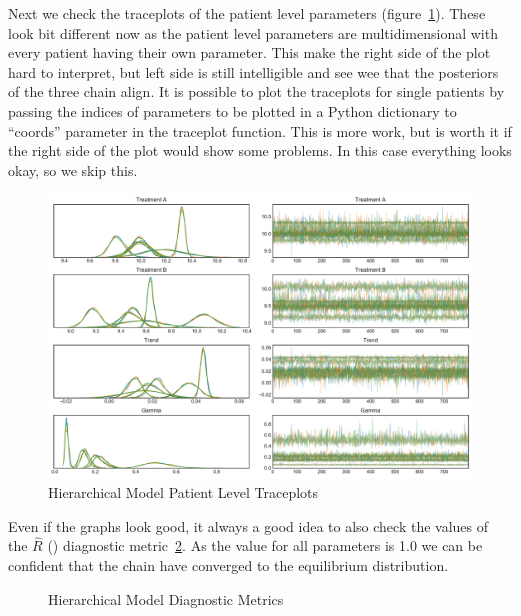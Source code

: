\documentclass[12pt,a4paper,leqno]{report}
\theoremstyle{plain}
\theoremstyle{definition}
\theoremstyle{remark}
\begin{document}
Next we check the traceplots of the patient level parameters (figure\
\ref{hierarchicalmodelpatienttraceplots}). These look bit different now as the patient
level parameters are multidimensional with every patient having their own
parameter. This make the right side of the plot hard to interpret, but left side is
still intelligible and see wee that the posteriors of the three chain align. It is
possible to plot the traceplots for single patients by passing the indices of parameters
to be plotted in a Python dictionary to ``coords'' parameter in the traceplot function.
This is more work, but is worth it if the right side of the plot would show some
problems. In this case everything looks okay, so we skip this.

\bigskip
\begin{figure}[H]
    \caption{Hierarchical Model Patient Level Traceplots}\label{hierarchicalmodelpatienttraceplots}
    \bigskip
    \includegraphics[width=\textwidth,height=\textheight,keepaspectratio]{hierarchical_model_patient_level_traceplot.pdf}
\end{figure}
\bigskip

Even if the graphs look good, it always a good idea to also check the values of the
\(\hat{R}\) (\pyv{r_hat}) diagnostic metric\ \ref{hierarchicalmodeldiagnosticmeasures}. As
the value for all parameters is 1.0 we can be confident that the chain have converged to
the equilibrium distribution.

\begin{figure}[H]
    \caption{Hierarchical Model Diagnostic Metrics}\label{hierarchicalmodeldiagnosticmeasures}
    \bigskip
    \centering
    \resizebox{!}{3.2in}{%
    
    }
\end{figure}
\bigskip
\end{document}
